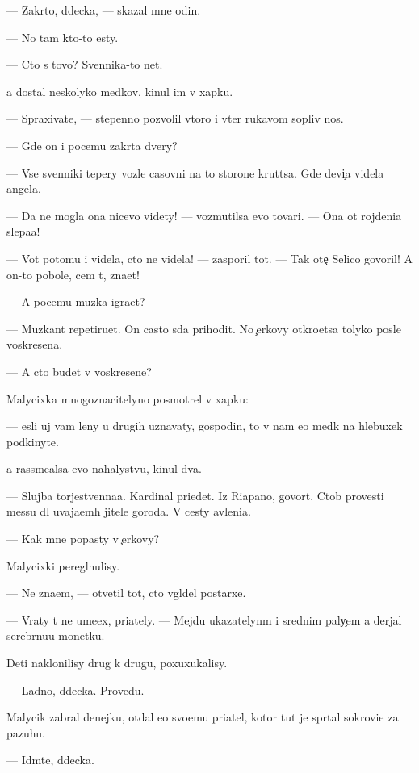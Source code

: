\documentclass[10pt]{book}
\begin{document}
— Zakr{\yi}to, d{\ia}decka, — skazal mne odin.

— No tam kto-to {\y}esty.

— Cto s tovo? Sv{\ia}{\x}ennika-to net.

{\Y}a dostal neskolyko med{\ia}kov, kinul im v xapku.

— Spraxiva{\y}te, — stepenno pozvolil vtoro{\y} i v{\yi}ter rukavom sopliv{\yi}{\y} nos.

— Gde on i pocemu zakr{\yi}ta dvery?

— Vse sv{\ia}{\x}enniki tepery voz\-le casovni na to{\y} storone krut{\ia}tsa. Gde devi{\c}a videla angela.

— Da ne mogla ona nicevo videty! — vozmutilsa {\y}evo tovari{\x}. — Ona ot rojdeni{\y}a slepa{\y}a!

— Vot potomu i videla, cto ne videla! — zasporil tot. — Tak ote{\c} Selico govoril! A on-to pobole, cem t{\yi}, zna{\y}et!

— A pocemu muz{\yi}ka igra{\y}et?

— Muz{\yi}kant repetiru{\y}et. On casto s{\io}da prihodit. No {\c}erkovy otkro{\y}etsa tolyko posle voskresen{\y}a.

— A cto budet v voskresen{\y}e?

Malycixka mnogoznacitelyno posmotrel v xapku:

— {\Y}esli uj vam leny u drugih uznavaty, gospodin, to v{\yi} nam {\y}e{\x}o med{\ia}k na hlebuxek podkinyte.

{\Y}a rassme{\y}alsa {\y}evo nahalystvu, kinul dva.

— Slujba torjestvenna{\y}a. Kardinal pri{\y}edet. Iz Riapano, govor{\ia}t. Ctob{\yi} provesti messu dl{\ia} uvaja{\y}em{\yi}h jitele{\y} go\-ro\-da. V cesty {\y}avleni{\y}a.

— Kak mne popasty v {\c}erkovy?

Malycixki peregl{\ia}nulisy.

— Ne zna{\y}em, — otvetil tot, cto v{\yi}gl{\ia}del postarxe.

— Vraty t{\yi} ne ume{\y}ex, pri{\y}ately. — Mejdu ukazatelyn{\yi}m i srednim paly{\c}em {\y}a derjal serebr{\ia}nu{\y}u monetku.

Deti naklonilisy drug k drugu, poxuxukalisy.

— Ladno, d{\ia}decka. Provedu.

Malycik zabral denejku, otdal {\y}e{\y}o svo{\y}emu pri{\y}atel{\io}, kotor{\yi}{\y} tut je spr{\ia}tal sokrovi{\x}e za pazuhu.

— Id{\e}mte, d{\ia}decka.
\end{document}
